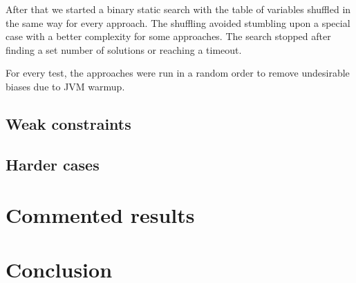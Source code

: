 \documentclass[a4paper,10pt]{article}
\begin{document}
After that we started a binary static search with the table of variables shuffled in the same way for every approach. The shuffling avoided stumbling upon a special case with a better complexity for some approaches. The search stopped after finding a set number of solutions or reaching a timeout.

For every test, the approaches were run in a random order to remove undesirable biases due to JVM warmup.

\subsection{Weak constraints}
\label{subsec:tests-weak}
\subsection{Harder cases}
\label{subsec:tests-hard}

\section{Commented results}

\section{Conclusion}
\end{document}
